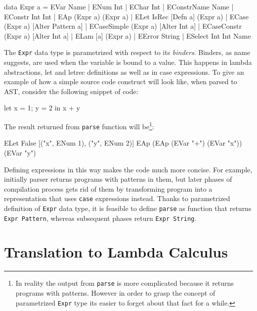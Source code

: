 \documentclass[12pt,a4paper]{report}
\begin{document}
\vspace*{0.2in}
\begin{code}[style=haskell]
  data Expr a = EVar Name
              | ENum Int
              | EChar Int
              | EConstrName Name
              | EConstr Int Int
              | EAp (Expr a) (Expr a)
              | ELet IsRec [Defn a] (Expr a)
              | ECase (Expr a) [Alter Pattern a]
              | ECaseSimple (Expr a) [Alter Int a]
              | ECaseConstr (Expr a) [Alter Int a]
              | ELam [a] (Expr a)
              | EError String
              | ESelect Int Int Name
\end{code}

The \texttt{Expr} data type is parametrized with respect to its
\textit{binders}. Binders, as name suggests, are used when the variable is
bound to a value. This happens in lambda abstractions, let and letrec
definitions as well as in case expressions. To give an example of how a simple
source code construct will look like, when parsed to AST, consider the
following snippet of code:

\vspace*{0.2in}
\begin{code}[style=haskell]
  let
      x = 1;
      y = 2
  in
      x + y
\end{code}

The result returned from \texttt{parse} function will be\footnote{In reality
the output from \texttt{parse} is more complicated because it returns programs
with patterns. However in order to grasp the concept of parametrized
\texttt{Expr} type its easier to forget about that fact for a while.}:

\vspace*{0.2in}
\begin{code}[style=haskell]
  ELet False
       [("x", ENum 1), ("y", ENum 2)]
       EAp (EAp (EVar "+") (EVar "x")) (EVar "y")
\end{code}

Defining expressions in this way makes the code much more concise. For example,
initially parser returns programs with patterns in them, but later phases of
compilation process gets rid of them by transforming program into a
representation that uses \texttt{case} expressions instead. Thanks to
parametrized definition of \texttt{Expr} data type, it is feasible to define
\texttt{parse} as function that returns \texttt{Expr Pattern}, whereas
subsequent phases return \texttt{Expr String}.


\chapter{Translation to Lambda Calculus}
\end{document}
